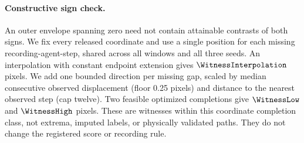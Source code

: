 \paragraph{Constructive sign check.}
An outer envelope spanning zero need not contain attainable
contrasts of both signs. We fix every released coordinate and
use a single position for each missing recording-agent-step,
shared across all windows and all three seeds. An
interpolation with constant endpoint extension gives
$\WitnessInterpolation$ pixels. We add one bounded direction
per missing gap, scaled by median consecutive observed
displacement (floor 0.25 pixels) and distance to the nearest
observed step (cap twelve). Two feasible optimized
completions give $\WitnessLow$ and $\WitnessHigh$ pixels.
These are witnesses within this coordinate completion class,
not extrema, imputed labels, or physically validated paths.
They do not change the registered score or recording rule.
